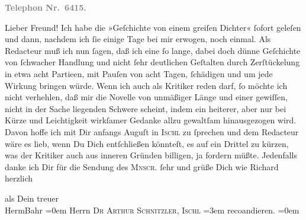 \pstart
           \textcolor{gray}{\textbf{Telephon Nr. 6415.}}\pend
           
\pstart{}Lieber Freund!\pend\vspace{0.5em}
\pstart
           Ich habe die »Geſchichte von einem greiſen
                  Dichter«{ }ſofort geleſen und dann, nachdem ich{ }ſie einige Tage bei mir
               erwogen, noch einmal. Als Redacteur muß ich nun{ }ſagen, daß ich eine{ }ſo lange, dabei
               doch dünne Geſchichte von{ }ſchwacher Handlung und nicht{ }ſehr deutlichen Geſtalten
               durch Zerſtückelung in etwa acht Partieen, mit Pauſen von acht Tagen,{ }ſchädigen und
               um jede Wirkung bringen würde. Wenn ich auch als Kritiker reden darf,{ }ſo möchte ich
               nicht verhehlen, daß mir die Novelle von unmäßiger Länge und {\pb}einer gewiſſen, nicht in der Sache liegenden
               Schwere scheint, indem ein heiterer, aber nur bei Kürze und Leichtigkeit wirkſamer
               Gedanke allzu gewaltſam hinausgezogen wird. Davon hoffe ich mit Dir anfangs Auguſt in
                  \textsc{Ischl} zu{ }ſprechen und dem Redacteur wäre es lieb, wenn Du Dich entſchließen könnteſt,
               es auf ein Drittel zu kürzen, was der Kritiker auch aus inneren Gründen billigen, ja
               fordern müßte. Jedenfalls danke ich Dir für die Sendung des \textsc{Mnscr}.{ }ſehr und grüße Dich wie Richard herzlich\pend
           
\pstart
           als Dein treuer{\\[\baselineskip]}\spacefill\mbox{HermBahr}\pend
           \leftskip=0em{}
\pstart
           \noindent{}Herrn \textsc{Dr Arthur Schnitzler, Ischl}\pend
           \leftskip=3em{}
\pstart
           \noindent{}reco{\geminationm}andieren.\pend
           \leftskip=0em{}
\pstart
           \textcolor{gray}{\textbf{\label{T_L00465-1v}\label{T_L00465-1}}}\pend
           \endnumbering{}  \newcommand{\dateiname}{L00465}\newcommand{\titel}{Hermann Bahr an Arthur Schnitzler, 23. 7. 1895}\newcommand{\editorInnen}{Herausgegeben von Martin Anton Müller}
